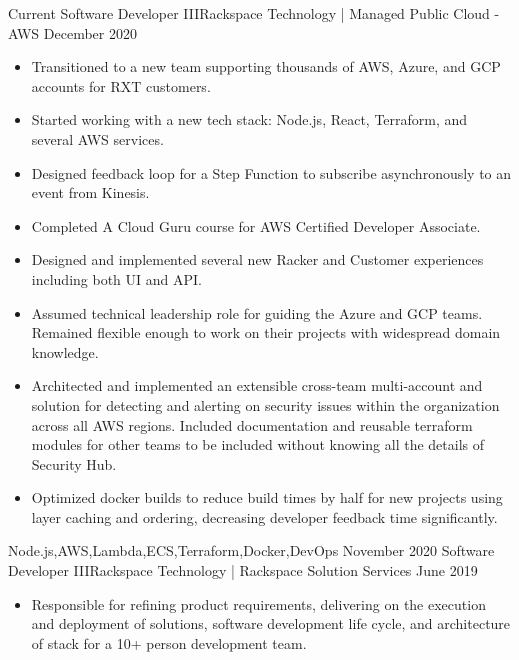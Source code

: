 \begin{experiences}
  \experience
    {Current}       {Software Developer III}{Rackspace Technology | Managed Public Cloud - AWS}
    {December 2020} {
                      \begin{itemize}
                        \item Transitioned to a new team supporting thousands of AWS, Azure, and GCP accounts for RXT customers.
                        \item Started working with a new tech stack: Node.js, React, Terraform, and several AWS services.
                        \item Designed feedback loop for a Step Function to subscribe asynchronously to an event from Kinesis.
                        \item Completed A Cloud Guru course for AWS Certified Developer Associate.
                        \item Designed and implemented several new Racker and Customer experiences including both UI and API.
                        \item Assumed technical leadership role for guiding the Azure and GCP teams. Remained flexible enough to work on their projects with widespread domain knowledge.
                        \item Architected and implemented an extensible cross-team multi-account  and  solution for detecting and alerting on security issues within the organization across all AWS regions. Included documentation and reusable terraform modules for other teams to be included without knowing all the details of Security Hub.
                        \item Optimized docker builds to reduce build times by half for new projects using layer caching and ordering, decreasing developer feedback time significantly.
                      \end{itemize}
                    }
                    {Node.js,AWS,Lambda,ECS,Terraform,Docker,DevOps}
  \emptySeparator
  \experience
    {November 2020} {Software Developer III}{Rackspace Technology | Rackspace Solution Services}
    {June 2019}     {
                      \begin{itemize}
                        \item Responsible for refining product requirements, delivering on the execution and deployment of solutions, software development life cycle, and architecture of stack for a 10+ person development team.

\end{itemize}}
\end{experiences}
